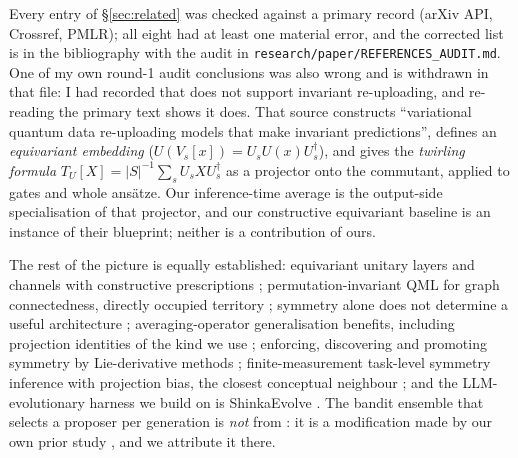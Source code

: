 \documentclass[11pt]{article}
\begin{document}
Every entry of \S\ref{sec:related} was checked against a primary record (arXiv API,
Crossref, PMLR); all eight had at least one material error, and the corrected list is in
the bibliography with the audit in \texttt{research/paper/REFERENCES\_AUDIT.md}. One of my
own round-1 audit conclusions was also wrong and is withdrawn in that file: I had recorded
that \cite{meyer2023} does not support invariant re-uploading, and re-reading the primary
text shows it does. That source constructs ``variational quantum data re-uploading models
that make invariant predictions'', defines an \emph{equivariant embedding} ($U(V_s[x]) = U_s U(x) U_s^{\dagger}$),
and gives the \emph{twirling formula} $T_U[X] = |S|^{-1}\sum_{s} U_s X U_s^{\dagger}$ as a
projector onto the commutant, applied to gates and whole ans\"atze. Our inference-time
average is the output-side specialisation of that projector, and our constructive equivariant
baseline is an instance of their blueprint; neither is a contribution of ours.

The rest of the picture is equally established: equivariant unitary layers and channels with
constructive prescriptions \cite{nguyen2024}; permutation-invariant QML for graph connectedness,
directly occupied territory \cite{mansky2025}; symmetry alone does not determine a useful
architecture \cite{baumann2026}; averaging-operator generalisation benefits, including
projection identities of the kind we use \cite{elesedy2021}; enforcing, discovering and
promoting symmetry by Lie-derivative methods \cite{otto2023}; finite-measurement task-level
symmetry inference with projection bias, the closest conceptual neighbour \cite{chen2026}; and
the LLM-evolutionary harness we build on is ShinkaEvolve \cite{lange2025}. The bandit ensemble
that selects a proposer per generation is \emph{not} from \cite{lange2025}: it is a
modification made by our own prior study \cite{ho2026prior}, and we attribute it there.
\end{document}
